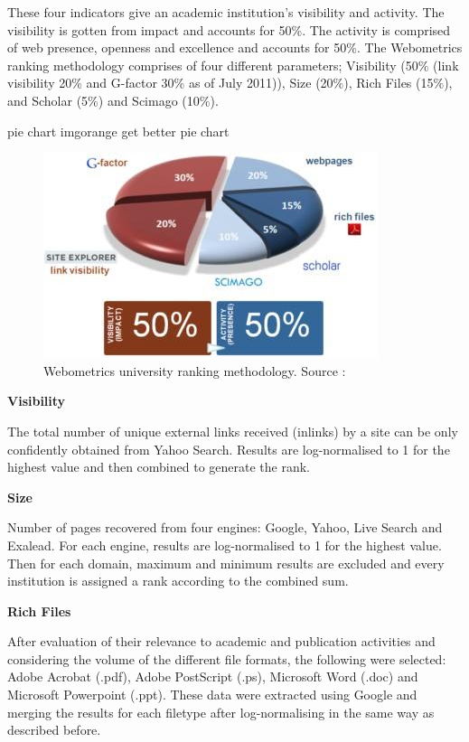 \noindent
These four indicators give an academic institution's visibility and activity. The visibility is gotten from impact and accounts for 50\%. The activity is comprised of web presence, openness and excellence and accounts for 50\%. The Webometrics ranking methodology comprises of four different parameters; Visibility (50\% (link visibility 20\% and G-factor 30\% as of July 2011)), Size (20\%), Rich Files (15\%), and Scholar (5\%) and Scimago (10\%).
\begin {review_comment}{pie chart img}{orange}
{get better pie chart}
\end{review_comment}
\begin{figure}[H]
	\includegraphics[width=\linewidth,scale=0.5]{../static/img/analysis_model.jpg}
	\caption{Webometrics university ranking methodology. Source :}
\end{figure}

\noindent
\textbf{Visibility}

\noindent
The total number of unique external links received (inlinks) by a site can be only confidently obtained from Yahoo Search. Results are log-normalised to 1 for the highest value and
then combined to generate the rank.

\noindent
\textbf{Size}

\noindent
Number of pages recovered from four engines: Google, Yahoo, Live Search and Exalead. For each engine, results are log-normalised to 1 for the highest value. Then for each domain, maximum
and minimum results are excluded and every institution is assigned a rank according to the combined sum.

\noindent
\textbf{Rich Files}

\noindent
After evaluation of their relevance to academic and publication activities and considering the volume of the different file formats, the following were selected: Adobe Acrobat (.pdf), Adobe PostScript (.ps), Microsoft Word (.doc) and Microsoft Powerpoint (.ppt). These data were extracted using Google and merging the results for each 
filetype after log-normalising in the same way as described before.

